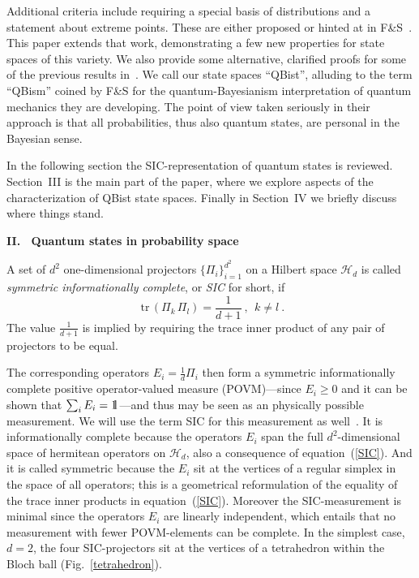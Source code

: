\documentclass[letterpaper,11pt]{article}
\newcommand{\id}{{\hbox{{\rm 1}\kern-.24em\hbox{\rm l}}}}
\begin{document}
Additional criteria include requiring a special basis of distributions and a statement about extreme points. These are either proposed or hinted at in F\&S~\cite{Fuchs&Schack}. This paper extends that work, demonstrating a few new properties for state spaces of this variety. We also provide some alternative, clarified proofs for some of the previous results in~\cite{Fuchs&Schack}. We call our state spaces ``QBist'', alluding to the term ``QBism'' coined by F\&S for the quantum-Bayesianism interpretation of quantum mechanics they are developing. The point of view taken seriously in their approach is that all probabilities, thus also quantum states, are personal in the Bayesian sense.

In the following section the SIC-representation of quantum states is reviewed. Section~III is the main part of the paper, where we explore aspects of the characterization of QBist state spaces.  Finally in Section~IV we briefly discuss where things stand.


\begin{center}\vspace{2mm}
  {\Large \bf II. \ Quantum states in probability space}
\end{center}\vspace{2mm}

A set of  $d^2$ one-dimensional projectors $\{\Pi_i\}_{i=1}^{d^2}$ on a Hilbert space $\mathcal H_d$ is called \emph{symmetric informationally complete}, or \emph{SIC} for short, if
%
\begin{equation} \label{SIC}
   \textrm{ tr} \,(\Pi_k\,\Pi_l) = \frac{1}{d+1} \ ,\  \ k\neq l \ .
\end{equation}
%
The value $\frac{1}{d+1}$ is implied by requiring the trace inner product of any pair of projectors to be equal.

The corresponding operators $E_i=\frac{1}{d}\Pi_i$ then form a symmetric informationally complete positive operator-valued measure (POVM)---since $E_i\geq 0$ and it can be shown that $\sum_i E_i=\id\,$---and thus may be seen as an physically possible measurement.  We will use the term SIC for this measurement as well~\cite{Caves99,Renes04}.  It is informationally complete because the operators $E_i$ span the full $d^2$-dimensional space of hermitean operators on $\mathcal H_d$, also a consequence of equation~(\ref{SIC}). And it is called symmetric because the $E_i$ sit at the vertices of a regular simplex in the space of all operators; this is a geometrical reformulation of the equality of the trace inner products in equation~(\ref{SIC}). Moreover the SIC-measurement is minimal since the operators $E_i$ are linearly independent, which entails that no measurement with fewer POVM-elements can be complete. In the simplest case, $d=2$, the four SIC-projectors sit at the vertices of a tetrahedron within the Bloch ball (Fig.~\ref{tetrahedron}).
\end{document}
